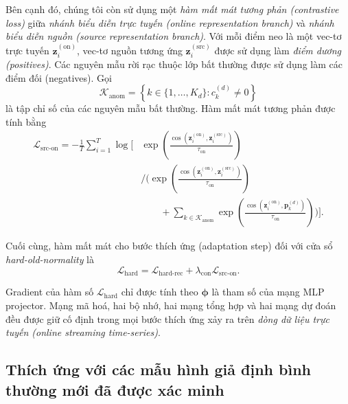 Bên cạnh đó, chúng tôi còn sử dụng một \textit{hàm mất mát tương phản (contrastive loss)} giữa \textit{nhánh biểu diễn trực tuyến (online representation branch)}
và \textit{nhánh biểu diễn nguồn (source representation branch)}. Với mỗi điểm neo là một vec-tơ trực tuyến
\(\mathbf{z}^{(\mathrm{on})}_{i}\), vec-tơ nguồn tương ứng
\(\mathbf{z}^{(\mathrm{src})}_{i}\) được sử dụng làm \textit{điểm dương (positives)}. Các nguyên
mẫu rời rạc thuộc lớp bất thường được sử dụng làm các điểm đối (negatives). Gọi \begin{equation}
\mathcal{K}_{\mathrm{anom}}
=
\left\{
k\in\{1,\ldots,K_d\}
:
c^{(d)}_k\neq 0
\right\}
\end{equation}
là tập chỉ số của các nguyên mẫu bất thường. Hàm mất mát tương phản được tính
bằng
\begin{equation}
\label{eq:src-on-loss}
\begin{aligned}
\mathcal{L}_{\mathrm{src\text{-}on}}
=
-\frac{1}{T}
\sum_{i=1}^{T}
\log
\Bigg[
&
\exp\left(
\frac{
\operatorname{cos}\left(
\mathbf{z}^{(\mathrm{on})}_{i},
\mathbf{z}^{(\mathrm{src})}_{i}
\right)
}{
\tau_{\mathrm{on}}
}
\right)
\\[-0.2em]
&\Bigg/
\Bigg(
\exp\left(
\frac{
\operatorname{cos}\left(
\mathbf{z}^{(\mathrm{on})}_{i},
\mathbf{z}^{(\mathrm{src})}_{i}
\right)
}{
\tau_{\mathrm{on}}
}
\right)
\\
&\qquad
+
\sum_{k\in\mathcal{K}_{\mathrm{anom}}}
\exp\left(
\frac{
\operatorname{cos}\left(
\mathbf{z}^{(\mathrm{on})}_{i},
\mathbf{p}^{(d)}_k
\right)
}{
\tau_{\mathrm{on}}
}
\right)
\Bigg)
\Bigg].
\end{aligned}
\end{equation}

Cuối cùng, hàm mất mát cho bước thích ứng (adaptation step) đối với cửa sổ \textit{hard-old-normality} là
\begin{equation}
\mathcal{L}_{\mathrm{hard}}
=
\mathcal{L}_{\mathrm{hard\text{-}rec}}
+
\lambda_{\mathrm{con}}
\mathcal{L}_{\mathrm{src\text{-}on}}.
\end{equation}

Gradient của hàm số  \(\mathcal{L}_{\mathrm{hard}}\) chỉ được tính theo \(\boldsymbol{\phi}\) là tham số của mạng MLP projector. Mạng mã hoá, hai bộ nhớ, hai mạng tổng hợp và hai mạng dự đoán đều được giữ cố định trong mọi bước thích ứng xảy ra trên \textit{dòng dữ liệu trực tuyến (online streaming time-series)}.

\subsection{Thích ứng với các mẫu hình giả định bình thường mới đã được xác minh}


